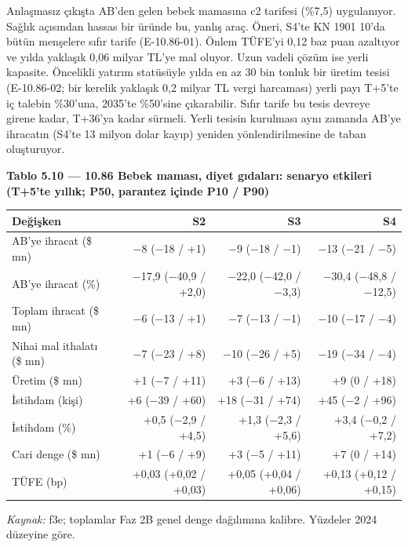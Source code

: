 Anlaşmasız çıkışta AB'den gelen bebek mamasına c2 tarifesi (\%7,5) uygulanıyor. Sağlık açısından hassas bir üründe bu, yanlış araç. Öneri, S4'te KN 1901 10'da bütün menşelere sıfır tarife (E-10.86-01). Önlem TÜFE'yi 0,12 baz puan azaltıyor ve yılda yaklaşık 0,06 milyar TL'ye mal oluyor. Uzun vadeli çözüm ise yerli kapasite. Öncelikli yatırım statüsüyle yılda en az 30 bin tonluk bir üretim tesisi (E-10.86-02; bir kerelik yaklaşık 0,2 milyar TL vergi harcaması) yerli payı T+5'te iç talebin \%30'una, 2035'te \%50'sine çıkarabilir. Sıfır tarife bu tesis devreye girene kadar, T+36'ya kadar sürmeli. Yerli tesisin kurulması aynı zamanda AB'ye ihracatın (S4'te 13 milyon dolar kayıp) yeniden yönlendirilmesine de taban oluşturuyor.


\textbf{Tablo 5.10 --- 10.86 Bebek maması, diyet gıdaları: senaryo etkileri (T+5'te yıllık; P50, parantez içinde P10 / P90)}

\nopagebreak[4]

\begingroup\gbtablo\small

\begin{longtable}[]{@{}lrrr@{}}
\toprule\noalign{}
\textbf{Değişken} & \textbf{S2} & \textbf{S3} & \textbf{S4} \\
\midrule\noalign{}
\endhead
\bottomrule\noalign{}
\endlastfoot
AB'ye ihracat (\$ mn) & −8 (−18 / +1) & −9 (−18 / −1) & −13 (−21 / −5) \\
AB'ye ihracat (\%) & −17,9 (−40,9 / +2,0) & −22,0 (−42,0 / −3,3) & −30,4 (−48,8 / −12,5) \\
Toplam ihracat (\$ mn) & −6 (−13 / +1) & −7 (−13 / −1) & −10 (−17 / −4) \\
Nihai mal ithalatı (\$ mn) & −7 (−23 / +8) & −10 (−26 / +5) & −19 (−34 / −4) \\
Üretim (\$ mn) & +1 (−7 / +11) & +3 (−6 / +13) & +9 (0 / +18) \\
İstihdam (kişi) & +6 (−39 / +60) & +18 (−31 / +74) & +45 (−2 / +96) \\
İstihdam (\%) & +0,5 (−2,9 / +4,5) & +1,3 (−2,3 / +5,6) & +3,4 (−0,2 / +7,2) \\
Cari denge (\$ mn) & +1 (−6 / +9) & +3 (−5 / +11) & +7 (0 / +14) \\
TÜFE (bp) & +0,03 (+0,02 / +0,03) & +0,05 (+0,04 / +0,06) & +0,13 (+0,12 / +0,15) \\
\end{longtable}

\endgroup

\emph{Kaynak:} \etiketT{} f3e; toplamlar Faz 2B genel denge dağılımına kalibre. Yüzdeler 2024 düzeyine göre.

